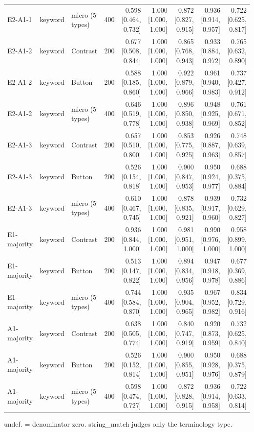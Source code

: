 \begin{table}[t]
\begin{tabular}{lllrrrrrr}
E2-A1-1 & keyword & micro (5 types) & 400 & 0.598 [0.464, 0.732] & 1.000 [1.000, 1.000] & 0.872 [0.827, 0.915] & 0.936 [0.914, 0.957] & 0.722 [0.625, 0.817] \\
E2-A1-2 & keyword & Contrast & 200 & 0.677 [0.508, 0.844] & 1.000 [1.000, 1.000] & 0.865 [0.768, 0.943] & 0.933 [0.884, 0.972] & 0.765 [0.632, 0.890] \\
E2-A1-2 & keyword & Button & 200 & 0.588 [0.185, 0.860] & 1.000 [1.000, 1.000] & 0.922 [0.879, 0.966] & 0.961 [0.940, 0.983] & 0.737 [0.427, 0.912] \\
E2-A1-2 & keyword & micro (5 types) & 400 & 0.646 [0.519, 0.778] & 1.000 [1.000, 1.000] & 0.896 [0.850, 0.938] & 0.948 [0.925, 0.969] & 0.761 [0.671, 0.852] \\
E2-A1-3 & keyword & Contrast & 200 & 0.657 [0.510, 0.800] & 1.000 [1.000, 1.000] & 0.853 [0.775, 0.925] & 0.926 [0.887, 0.963] & 0.748 [0.639, 0.857] \\
E2-A1-3 & keyword & Button & 200 & 0.526 [0.154, 0.818] & 1.000 [1.000, 1.000] & 0.900 [0.847, 0.953] & 0.950 [0.924, 0.977] & 0.688 [0.375, 0.884] \\
E2-A1-3 & keyword & micro (5 types) & 400 & 0.610 [0.467, 0.745] & 1.000 [1.000, 1.000] & 0.878 [0.835, 0.921] & 0.939 [0.917, 0.960] & 0.732 [0.629, 0.827] \\
E1-majority & keyword & Contrast & 200 & 0.936 [0.844, 1.000] & 1.000 [1.000, 1.000] & 0.981 [0.951, 1.000] & 0.990 [0.976, 1.000] & 0.958 [0.899, 1.000] \\
E1-majority & keyword & Button & 200 & 0.513 [0.147, 0.822] & 1.000 [1.000, 1.000] & 0.894 [0.834, 0.956] & 0.947 [0.918, 0.978] & 0.677 [0.369, 0.886] \\
E1-majority & keyword & micro (5 types) & 400 & 0.744 [0.584, 0.870] & 1.000 [1.000, 1.000] & 0.935 [0.904, 0.965] & 0.967 [0.952, 0.982] & 0.834 [0.729, 0.916] \\
A1-majority & keyword & Contrast & 200 & 0.638 [0.505, 0.774] & 1.000 [1.000, 1.000] & 0.840 [0.747, 0.919] & 0.920 [0.873, 0.959] & 0.732 [0.625, 0.840] \\
A1-majority & keyword & Button & 200 & 0.526 [0.152, 0.814] & 1.000 [1.000, 1.000] & 0.900 [0.855, 0.951] & 0.950 [0.928, 0.976] & 0.688 [0.375, 0.879] \\
A1-majority & keyword & micro (5 types) & 400 & 0.598 [0.474, 0.727] & 1.000 [1.000, 1.000] & 0.872 [0.828, 0.915] & 0.936 [0.914, 0.958] & 0.722 [0.633, 0.814] \\
\bottomrule
\end{tabular}
\par\footnotesize undef. = denominator zero. string\_match judges only the terminology type.
\end{table}
